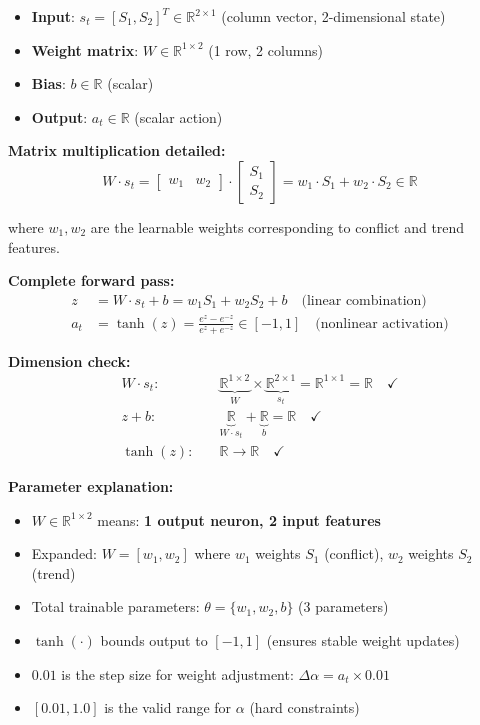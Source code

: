 \documentclass[11pt,a4paper]{article}
\begin{document}
\begin{itemize}
\begin{itemize}
    \item \textbf{Input}: $s_t = [S_1, S_2]^T \in \mathbb{R}^{2 \times 1}$ (column vector, 2-dimensional state)
    \item \textbf{Weight matrix}: $W \in \mathbb{R}^{1 \times 2}$ (1 row, 2 columns)
    \item \textbf{Bias}: $b \in \mathbb{R}$ (scalar)
    \item \textbf{Output}: $a_t \in \mathbb{R}$ (scalar action)
\end{itemize}

\textbf{Matrix multiplication detailed:}
\begin{equation}
W \cdot s_t = \begin{bmatrix} w_1 & w_2 \end{bmatrix} \cdot \begin{bmatrix} S_1 \\ S_2 \end{bmatrix} = w_1 \cdot S_1 + w_2 \cdot S_2 \in \mathbb{R}
\end{equation}

where $w_1, w_2$ are the learnable weights corresponding to conflict and trend features.

\textbf{Complete forward pass:}
\begin{align}
z &= W \cdot s_t + b = w_1 S_1 + w_2 S_2 + b \quad \text{(linear combination)} \\
a_t &= \tanh(z) = \frac{e^z - e^{-z}}{e^z + e^{-z}} \in [-1, 1] \quad \text{(nonlinear activation)}
\end{align}

\textbf{Dimension check:}
\begin{align}
W \cdot s_t: & \quad \underbrace{\mathbb{R}^{1 \times 2}}_{W} \times \underbrace{\mathbb{R}^{2 \times 1}}_{s_t} = \mathbb{R}^{1 \times 1} = \mathbb{R} \quad \checkmark \\
z + b: & \quad \underbrace{\mathbb{R}}_{W \cdot s_t} + \underbrace{\mathbb{R}}_{b} = \mathbb{R} \quad \checkmark \\
\tanh(z): & \quad \mathbb{R} \rightarrow \mathbb{R} \quad \checkmark
\end{align}

\textbf{Parameter explanation:}
\begin{itemize}
    \item $W \in \mathbb{R}^{1 \times 2}$ means: \textbf{1 output neuron, 2 input features}
    \item Expanded: $W = [w_1, w_2]$ where $w_1$ weights $S_1$ (conflict), $w_2$ weights $S_2$ (trend)
    \item Total trainable parameters: $\theta = \{w_1, w_2, b\}$ (3 parameters)
    \item $\tanh(\cdot)$ bounds output to $[-1, 1]$ (ensures stable weight updates)
    \item $0.01$ is the step size for weight adjustment: $\Delta\alpha = a_t \times 0.01$
    \item $[0.01, 1.0]$ is the valid range for $\alpha$ (hard constraints)
\end{itemize}


\end{itemize}
\end{document}
